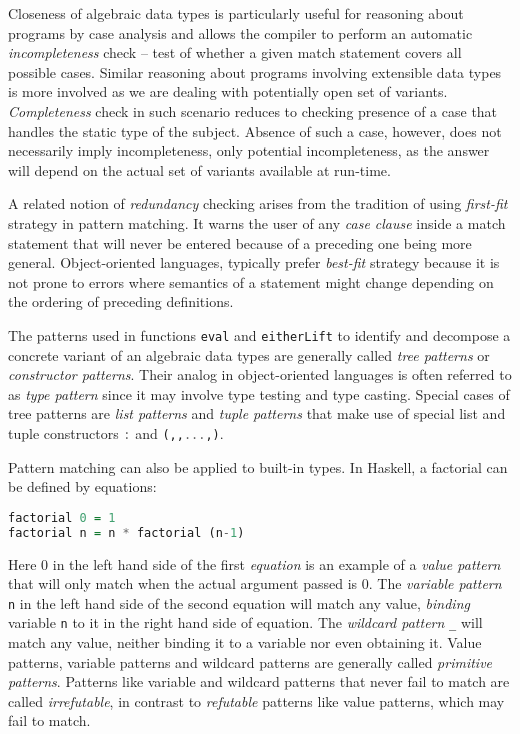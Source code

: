 \documentclass{llncs}
\DeclareRobustCommand{\codehaskell}[1]{{\lstinline[breaklines=false,language=Haskell]{#1}}}
\DeclareRobustCommand{\codeocaml}[1]{{\lstinline[breaklines=false,language=Caml]{#1}}}
\begin{document}
Closeness of algebraic data types is particularly useful for reasoning about 
programs by case analysis and allows the compiler to perform an automatic 
\emph{incompleteness} check -- test of whether a given match statement 
covers all possible cases. Similar reasoning about programs involving extensible 
data types is more involved as we are dealing with potentially open set of 
variants. \emph{Completeness} check in such scenario reduces to checking presence 
of a case that handles the static type of the subject. Absence of such a case,
however, does not necessarily imply incompleteness, only potential incompleteness, 
as the answer will depend on the actual set of variants available at run-time.

A related notion of \emph{redundancy} checking arises from the 
tradition of using \emph{first-fit} strategy in pattern matching. It warns the 
user of any \emph{case clause} inside a match statement that will 
never be entered because of a preceding one being more general. Object-oriented 
languages, typically prefer \emph{best-fit} strategy because it is not prone 
to errors where semantics of a statement might change depending on the ordering 
of preceding definitions. 

The patterns used in functions \codeocaml{eval} and \codehaskell{eitherLift} to 
identify and decompose a concrete variant of an algebraic data types are 
generally called \emph{tree patterns} or \emph{constructor patterns}. Their 
analog in object-oriented languages is often referred to as \emph{type pattern} 
since it may involve type testing and type casting. Special cases of tree patterns  
are \emph{list patterns} and \emph{tuple patterns} that make use of special list 
and tuple constructors \codehaskell{:} and \codehaskell{(,,...,)}.

Pattern matching can also be applied to built-in types.
In Haskell, a factorial can be defined by equations:

\begin{lstlisting}[language=Haskell]
factorial 0 = 1
factorial n = n * factorial (n-1)
\end{lstlisting}

\noindent
Here 0 in the left hand side of the first \emph{equation} is an example of a 
\emph{value pattern} that will only match when the actual argument passed is 0. 
The \emph{variable pattern} \codehaskell{n} in the left hand side of the second 
equation will match any value, \emph{binding} variable \codehaskell{n} to it in 
the right hand side of equation. The \emph{wildcard pattern} \codehaskell{_}  
will match any value, neither binding it to a variable nor even obtaining it. 
Value patterns, variable patterns and wildcard patterns are  
generally called \emph{primitive patterns}. Patterns like variable and wildcard 
patterns that never fail to match are called \emph{irrefutable}, in contrast to 
\emph{refutable} patterns like value patterns, which may fail to match.
\end{document}
